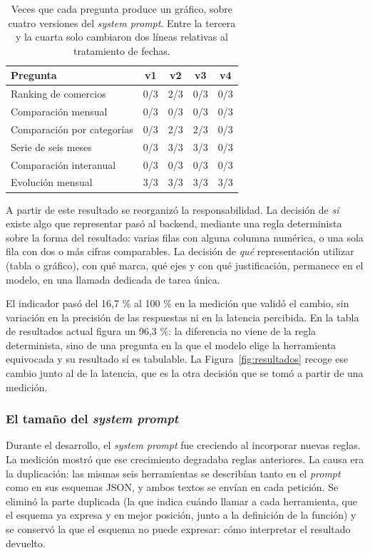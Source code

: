 \begin{table}[h]
\centering
\begin{tabular}{lcccc}
\toprule
\textbf{Pregunta} & \textbf{v1} & \textbf{v2} & \textbf{v3} & \textbf{v4} \\
\midrule
Ranking de comercios          & 0/3 & 2/3 & 0/3 & 0/3 \\
Comparación mensual           & 0/3 & 0/3 & 0/3 & 0/3 \\
Comparación por categorías    & 0/3 & 2/3 & 2/3 & 0/3 \\
Serie de seis meses           & 0/3 & 3/3 & 3/3 & 0/3 \\
Comparación interanual        & 0/3 & 0/3 & 0/3 & 0/3 \\
Evolución mensual             & 3/3 & 3/3 & 3/3 & 3/3 \\
\bottomrule
\end{tabular}
\caption{Veces que cada pregunta produce un gráfico, sobre cuatro versiones del
\textit{system prompt}. Entre la tercera y la cuarta solo cambiaron dos líneas
relativas al tratamiento de fechas.}
\end{table}

A partir de este resultado se reorganizó la responsabilidad. La decisión de
\textit{si} existe algo que representar pasó al backend, mediante una regla
determinista sobre la forma del resultado: varias filas con alguna columna
numérica, o una sola fila con dos o más cifras comparables. La decisión de
\textit{qué} representación utilizar (tabla o gráfico), con qué marca, qué ejes
y con qué justificación, permanece en el modelo, en una llamada dedicada de
tarea única.

El indicador pasó del 16,7 \% al 100 \% en la medición que validó el cambio, sin
variación en la precisión de las respuestas ni en la latencia percibida. En la
tabla de resultados actual figura un 96,3 \%: la diferencia no viene de la regla
determinista, sino de una pregunta en la que el modelo elige la herramienta
equivocada y su resultado sí es tabulable. La Figura~\ref{fig:resultados} recoge
ese cambio junto al de la latencia, que es la otra decisión que se tomó a partir
de una medición.



\subsubsection{El tamaño del \textit{system prompt}}

Durante el desarrollo, el \textit{system prompt} fue creciendo al incorporar
nuevas reglas. La medición mostró que ese crecimiento degradaba reglas
anteriores. La causa era la duplicación: las mismas seis herramientas se describían tanto en
el \textit{prompt} como en sus esquemas JSON, y ambos textos se envían en cada
petición. Se eliminó la parte duplicada (la que indica cuándo llamar a cada
herramienta, que el esquema ya expresa y en mejor posición, junto a la
definición de la función) y se conservó la que el esquema no puede expresar:
cómo interpretar el resultado devuelto.

